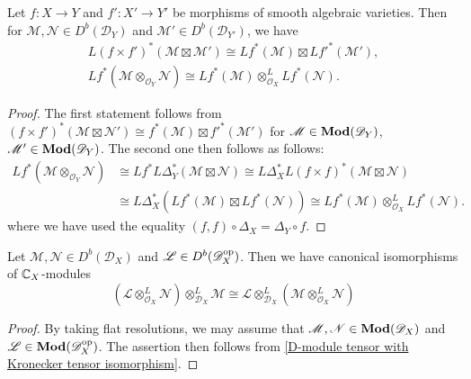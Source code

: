 \begin{proposition}\label{D-module inverse image and tensor prop}
Let $f:X\to Y$ and $f':X'\to Y'$ be morphisms of smooth algebraic varieties. Then for $\mathscr{M},\mathscr{N}\in D^b(\mathscr{D}_Y)$ and $\mathscr{M}'\in D^b(\mathscr{D}_{Y'})$, we have
\begin{gather*}
L(f\times f')^*(\mathscr{M}\boxtimes\mathscr{M}')\cong Lf^*(\mathscr{M})\boxtimes Lf'^*(\mathscr{M}'),\label{D-module inverse image and tensor prop-1}\\
Lf^*(\mathscr{M}\otimes_{\mathscr{O}_Y}\mathscr{N})\cong Lf^*(\mathscr{M})\otimes_{\mathscr{O}_X}^LLf^*(\mathscr{N}).\label{D-module inverse image and tensor prop-2}
\end{gather*}
\end{proposition}
\begin{proof}
The first statement follows from $(f\times f')^*(\mathscr{M}\boxtimes\mathscr{N}')\cong f^*(\mathscr{M})\boxtimes f'^*(\mathscr{M}')$ for $\mathscr{M}\in\mathbf{Mod}(\mathscr{D}_Y)$, $\mathscr{M}'\in\mathbf{Mod}(\mathscr{D}_Y)$. The second one then follows as follows:
\begin{equation*}
\begin{aligned}
Lf^*(\mathscr{M}\otimes_{\mathscr{O}_Y}\mathscr{N})&\cong Lf^*L\Delta_Y^*(\mathscr{M}\boxtimes\mathscr{N})\cong L\Delta_X^*L(f\times f)^*(\mathscr{M}\boxtimes\mathscr{N})\\
&\cong L\Delta_X^*(Lf^*(\mathscr{M})\boxtimes Lf^*(\mathscr{N}))\cong Lf^*(\mathscr{M})\otimes_{\mathscr{O}_X}^LLf^*(\mathscr{N}).
\end{aligned}
\end{equation*}
where we have used the equality $(f,f)\circ\Delta_X=\Delta_Y\circ f$.
\end{proof}

\begin{proposition}\label{D-module derived tensor and base change}
Let $\mathscr{M},\mathscr{N}\in D^b(\mathscr{D}_X)$ and $\mathscr{L}\in D^b(\mathscr{D}_X^{\mathrm{op}})$. Then we have canonical isomorphisms of $\mathbb{C}_X$-modules
\[(\mathscr{L}\otimes_{\mathscr{O}_X}^L\mathscr{N})\otimes_{\mathscr{D}_X}^L\mathscr{M}\cong\mathscr{L}\otimes_{\mathscr{D}_X}^L(\mathscr{M}\otimes_{\mathscr{O}_X}^L\mathscr{N})\]
\end{proposition}
\begin{proof}
By taking flat resolutions, we may assume that $\mathscr{M},\mathscr{N}\in\mathbf{Mod}(\mathscr{D}_X)$ and $\mathscr{L}\in\mathbf{Mod}(\mathscr{D}_X^{\mathrm{op}})$. The assertion then follows from \cref{D-module tensor with Kronecker tensor isomorphism}.
\end{proof}

